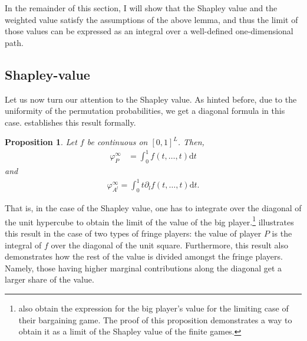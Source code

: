 \documentclass[a4paper]{article}
\newtheorem{proposition}{Proposition}
\newcommand{\dt}{\mathrm{d}t}
\begin{document}
In the remainder of this section, I will show that the Shapley value and the weighted value satisfy the assumptions of the above lemma, and thus the limit of those values can be expressed as an integral over a well-defined one-dimensional path.

\subsection{Shapley-value}

Let us now turn our attention to the Shapley value.
As hinted before, due to the uniformity of the permutation probabilities, we get a diagonal formula in this case.
 establishes this result formally.

\begin{proposition}
    \label{prop:many_sided_shapley}
    Let $f$ be continuous on $[0, 1]^L$.
    Then,
    \begin{align*}
        \varphi_P^\infty & = \int_0^1 f(t, \dots, t) \dt
    \end{align*}
    and
    \begin{align*}
        \varphi_{A^l}^\infty = \int_0^1 t \partial_l f(t, \dots, t) \dt.
    \end{align*}
\end{proposition}
That is, in the case of the Shapley value, one has to integrate over the diagonal of the unit hypercube to obtain the limit of the value of the big player.\footnote{
    \textcite{stole1996intra} also obtain the expression for the big player's value for the limiting case of their bargaining game.
    The proof of this proposition demonstrates a way to obtain it as a limit of the Shapley value of the finite games.
}
 illustrates this result in the case of two types of fringe players: the value of player $P$ is the integral of $f$ over the diagonal of the unit square.
Furthermore, this result also demonstrates how the rest of the value is divided amongst the fringe players.
Namely, those having higher marginal contributions along the diagonal get a larger share of the value.
\end{document}
